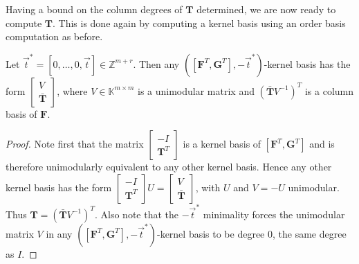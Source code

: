 Having a bound on the column degrees of $\mathbf{T}$ determined,
we are now ready to compute $\mathbf{T}$. This is done again by computing
a kernel basis using an order basis computation as before. 
\begin{lem}
Let $\vec{t}^{*}=\left[0,\dots,0,\vec{t}\right]\in\mathbb{Z}^{m+r}$.
Then any $\left(\left[\mathbf{F}^{T},\mathbf{G}^{T}\right],-\vec{t}^{*}\right)$-kernel
basis has the form $\begin{bmatrix}V\\
\bar{\mathbf{T}}
\end{bmatrix}$, where $V\in\mathbb{K}^{m\times m}$ is a unimodular matrix and $\left(\bar{\mathbf{T}}V^{-1}\right)^{T}$
is a column basis of $\mathbf{F}$. \end{lem}
\begin{proof}
Note first that the matrix $\begin{bmatrix}-I\\
\mathbf{T}^{T}
\end{bmatrix}$ is a kernel basis of $\left[\mathbf{F}^{T},\mathbf{G}^{T}\right]$
and is therefore unimodularly equivalent to any other kernel basis.
Hence any other kernel basis has the form $\begin{bmatrix}-I\\
\mathbf{T}^{T}
\end{bmatrix}U=\begin{bmatrix}V\\
\bar{\mathbf{T}}
\end{bmatrix}$, with $U$ and $V=-U$ unimodular. Thus $\mathbf{T}=\left(\bar{\mathbf{T}}V^{-1}\right)^{T}$.
Also note that the $-\vec{t}^{*}$ minimality forces the unimodular
matrix $V$ in any $\left(\left[\mathbf{F}^{T},\mathbf{G}^{T}\right],-\vec{t}^{*}\right)$-kernel
basis to be degree 0, the same degree as $I$. \end{proof}
